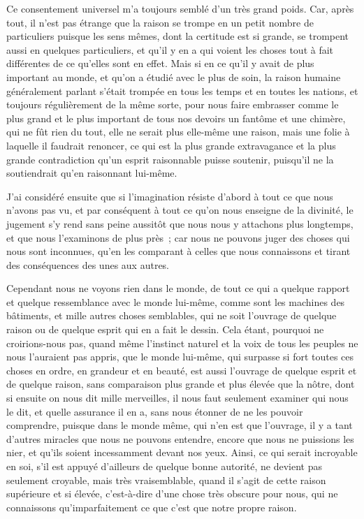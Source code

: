 \documentclass[french,twoside]{book} %
\begin{document}
Ce consentement universel m’a toujours semblé d’un très grand poids. Car, après tout, il n’est pas étrange que la raison se trompe en un petit nombre de particuliers puisque les sens mêmes, dont la certitude est si grande, se trompent aussi en quelques particuliers, et qu’il y en a qui voient les choses tout à fait différentes de ce qu’elles sont en effet. Mais si en ce qu’il y avait de plus important au monde, et qu’on a étudié avec le plus de soin, la raison humaine généralement parlant s’était trompée en tous les temps et en toutes les nations, et toujours régulièrement de la même sorte, pour nous faire embrasser comme le plus grand et le plus important de tous nos devoirs un fantôme et une chimère, qui ne fût rien du tout, elle ne serait plus elle-même une raison, mais une folie à laquelle il faudrait renoncer, ce qui est la plus grande extravagance et la plus grande contradiction qu’un esprit raisonnable puisse soutenir, puisqu’il ne la soutiendrait qu’en raisonnant lui-même.\par
J’ai considéré ensuite que si l’imagination résiste d’abord à tout ce que nous n’avons pas vu, et par conséquent à tout ce qu’on nous enseigne de la divinité, le jugement s’y rend sans peine aussitôt que nous nous y attachons plus longtemps, et que nous l’examinons de plus près ; car nous ne pouvons juger des choses qui nous sont inconnues, qu’en les comparant à celles que nous connaissons et tirant des conséquences des unes aux autres.\par
Cependant nous ne voyons rien dans le monde, de tout ce qui a quelque rapport et quelque ressemblance avec le monde lui-même, comme sont les machines des bâtiments, et mille autres choses semblables, qui ne soit l’ouvrage de quelque raison ou de quelque esprit qui en a fait le dessin. Cela étant, pourquoi ne croirions-nous pas, quand même l’instinct naturel et la voix de tous les peuples ne nous l’auraient pas appris, que le monde lui-même, qui surpasse si fort toutes ces choses en ordre, en grandeur et en beauté, est aussi l’ouvrage de quelque esprit et de quelque raison, sans comparaison plus grande et plus élevée que la nôtre, dont si ensuite on nous dit mille merveilles, il nous faut seulement examiner qui nous le dit, et quelle assurance il en a, sans nous étonner de ne les pouvoir comprendre, puisque dans le monde même, qui n’en est que l’ouvrage, il y a tant d’autres miracles que nous ne pouvons entendre, encore que nous ne puissions les nier, et qu’ils soient incessamment devant nos yeux. Ainsi, ce qui serait incroyable en soi, s’il est appuyé d’ailleurs de quelque bonne autorité, ne devient pas seulement croyable, mais très vraisemblable, quand il s’agit de cette raison supérieure et si élevée, c’est-à-dire d’une chose très obscure pour nous, qui ne connaissons qu’imparfaitement ce que c’est que notre propre raison.\par
\end{document}
